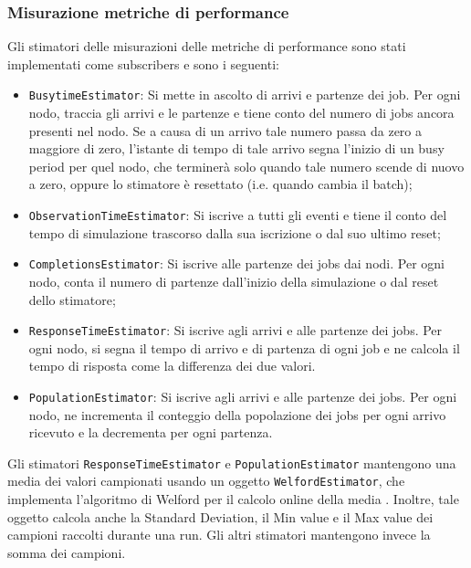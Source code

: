 \subsubsection{Misurazione metriche di performance}
Gli stimatori delle misurazioni delle metriche di performance sono stati implementati come subscribers e sono i seguenti:
\begin{itemize}
    \item \texttt{BusytimeEstimator}: Si mette in ascolto di arrivi e partenze dei job. Per ogni nodo, traccia gli arrivi e le partenze e tiene conto del numero di jobs ancora presenti nel nodo. Se a causa di un arrivo tale numero passa da zero a maggiore di zero, l'istante di tempo di tale arrivo segna l'inizio di un busy period per quel nodo, che terminerà solo quando tale numero scende di nuovo a zero, oppure lo stimatore è resettato (i.e. quando cambia il batch);
    \item \texttt{ObservationTimeEstimator}: Si iscrive a tutti gli eventi e tiene il conto del tempo di simulazione trascorso dalla sua iscrizione o dal suo ultimo reset;
    \item \texttt{CompletionsEstimator}: Si iscrive alle partenze dei jobs dai nodi. Per ogni nodo,
    conta il numero di partenze dall'inizio della simulazione o dal reset dello stimatore;
    \item \texttt{ResponseTimeEstimator}: Si iscrive agli arrivi e alle partenze dei jobs. Per ogni nodo, si segna il tempo di arrivo e di partenza di ogni job e ne calcola il tempo di risposta come la differenza dei due valori.
    \item \texttt{PopulationEstimator}: Si iscrive agli arrivi e alle partenze dei jobs. Per ogni nodo, ne incrementa il conteggio della popolazione dei jobs per ogni arrivo ricevuto e la decrementa per ogni partenza.
\end{itemize}

Gli stimatori \texttt{ResponseTimeEstimator} e \texttt{PopulationEstimator} mantengono una media dei valori campionati usando un oggetto \texttt{WelfordEstimator}, che implementa l'algoritmo di Welford per il calcolo online della media \citep{des}. Inoltre, tale oggetto calcola anche la Standard Deviation, il Min value e il Max value dei campioni raccolti durante una run. Gli altri stimatori mantengono invece la somma dei campioni.

